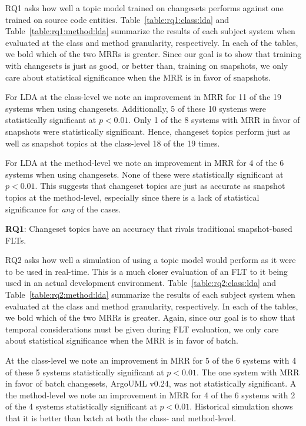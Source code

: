 RQ1 asks how well a topic model trained on changesets performs against
one trained on source code entities.
Table~\ref{table:rq1:class:lda} and Table~\ref{table:rq1:method:lda}
summarize the results of each subject system when
evaluated at the class and method granularity, respectively.
In each of the tables, we bold which of the two MRRs is greater.
Since our goal is to show that training with changesets is just as good, or
better than, training on snapshots, we only care about statistical significance
when the MRR is in favor of snapshots.

For LDA at the class-level we note an improvement in MRR for 11 of the 19 systems when using changesets.
Additionally, 5 of these 10 systems were statistically significant at $p<0.01$.
Only 1 of the 8 systems with MRR in favor of snapshots were statistically significant.
Hence, changeset topics perform just as well as snapshot topics at the class-level 18 of the 19 times.

For LDA at the method-level we note an improvement in MRR for 4 of the 6 systems when using changesets.
None of these were statistically significant at $p<0.01$.
This suggests that changeset topics are just as accurate as snapshot topics at the method-level,
especially since there is a lack of statistical significance for \emph{any} of the cases.

\begin{framed}
    \textbf{RQ1}:
    Changeset topics have an accuracy that rivals traditional snapshot-based FLTs.
\end{framed}



RQ2 asks how well a simulation of using a topic model would perform as it were to be used in real-time.
This is a much closer evaluation of an FLT to it being used in an actual development environment.
Table~\ref{table:rq2:class:lda} and Table~\ref{table:rq2:method:lda}
summarize the results of each subject system when
evaluated at the class and method granularity, respectively.
In each of the tables, we bold which of the two MRRs is greater.
Again, since our goal is to show that temporal considerations must be given
during FLT evaluation, we only care about statistical significance when the MRR
is in favor of batch.

At the class-level we note an improvement in MRR for 5 of the 6 systems
with 4 of these 5 systems statistically significant at $p<0.01$.
The one system with MRR in favor of batch changesets, ArgoUML v0.24, was not statistically significant.
A the method-level we note an improvement in MRR for 4 of the 6 systems
with 2 of the 4 systems statistically significant at $p<0.01$.
Historical simulation shows that it is better than batch at both the class- and method-level.

